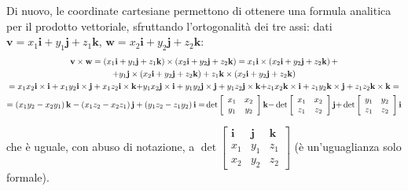 \documentclass{article}
\begin{document}
Di nuovo, le coordinate cartesiane permettono di ottenere una formula
analitica per il prodotto vettoriale, sfruttando l'ortogonalit\`{a} dei tre
assi: dati $\mathbf{v}=x_{1}\mathbf{i}+y_{1}\mathbf{j}+z_{1}\mathbf{k}$, $%
\mathbf{w}=x_{2}\mathbf{i}+y_{2}\mathbf{j}+z_{2}\mathbf{k}$: 
\begin{gather*}
\mathbf{v\times w}=\left( x_{1}\mathbf{i}+y_{1}\mathbf{j}+z_{1}\mathbf{k}%
\right) \times \left( x_{2}\mathbf{i}+y_{2}\mathbf{j}+z_{2}\mathbf{k}\right)
=x_{1}\mathbf{i}\times \left( x_{2}\mathbf{i}+y_{2}\mathbf{j}+z_{2}\mathbf{k}%
\right) + \\
+y_{1}\mathbf{j}\times \left( x_{2}\mathbf{i}+y_{2}\mathbf{j}+z_{2}\mathbf{k}%
\right) +z_{1}\mathbf{k}\times \left( x_{2}\mathbf{i}+y_{2}\mathbf{j}+z_{2}%
\mathbf{k}\right)  \\
=x_{1}x_{2}\mathbf{i}\times \mathbf{i}+x_{1}y_{2}\mathbf{i\times j}%
+x_{1}z_{2}\mathbf{i\times k+}y_{1}x_{2}\mathbf{j\times i}+y_{1}y_{2}\mathbf{%
j\times j}+y_{1}z_{2}\mathbf{j\times k+}z_{1}x_{2}\mathbf{k\times i}%
+z_{1}y_{2}\mathbf{k\times j}+z_{1}z_{2}\mathbf{k\times k=} \\
=\left( x_{1}y_{2}-x_{2}y_{1}\right) \mathbf{k}-\left(
x_{1}z_{2}-x_{2}z_{1}\right) \mathbf{j}+\left( y_{1}z_{2}-z_{1}y_{2}\right) 
\mathbf{i=}\det \left[ 
\begin{array}{cc}
x_{1} & x_{2} \\ 
y_{1} & y_{2}%
\end{array}%
\right] \mathbf{k-}\det \left[ 
\begin{array}{cc}
x_{1} & x_{2} \\ 
z_{1} & z_{2}%
\end{array}%
\right] \mathbf{j+}\det \left[ 
\begin{array}{cc}
y_{1} & y_{2} \\ 
z_{1} & z_{2}%
\end{array}%
\right] \mathbf{i}
\end{gather*}

che \`{e} uguale, con abuso di notazione, a $\det \left[ 
\begin{array}{ccc}
\mathbf{i} & \mathbf{j} & \mathbf{k} \\ 
x_{1} & y_{1} & z_{1} \\ 
x_{2} & y_{2} & z_{2}%
\end{array}%
\right] $ (\`{e} un'uguaglianza solo formale).
\end{document}

